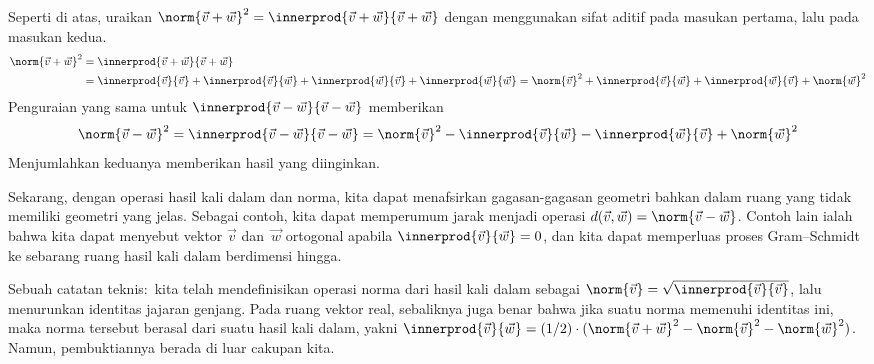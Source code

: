 Seperti di atas, uraikan
$
  \norm{\vec{v}+\vec{w}}^2=\innerprod{\vec{v}+\vec{w}}{\vec{v}+\vec{w}}
$
dengan menggunakan sifat aditif pada masukan pertama, lalu pada masukan kedua.
\begin{align*}
  \norm{\vec{v}+\vec{w}}^2
  &=\innerprod{\vec{v}+\vec{w}}{\vec{v}+\vec{w}}           \\
  &=\innerprod{\vec{v}}{\vec{v}}            
   +\innerprod{\vec{v}}{\vec{w}}
   +\innerprod{\vec{w}}{\vec{v}}
   +\innerprod{\vec{w}}{\vec{w}}
  =\norm{\vec{v}}^2            
   +\innerprod{\vec{v}}{\vec{w}}
   +\innerprod{\vec{w}}{\vec{v}}
   +\norm{\vec{w}}^2
\end{align*}
Penguraian yang sama untuk $\innerprod{\vec{v}-\vec{w}}{\vec{v}-\vec{w}}$
memberikan
\begin{equation*}
  \norm{\vec{v}-\vec{w}}^2
  =\innerprod{\vec{v}-\vec{w}}{\vec{v}-\vec{w}}
  =\norm{\vec{v}}^2
   -\innerprod{\vec{v}}{\vec{w}}
   -\innerprod{\vec{w}}{\vec{v}}
   +\norm{\vec{w}}^2
\end{equation*}
Menjumlahkan keduanya memberikan hasil yang diinginkan.

Sekarang, dengan operasi hasil kali dalam dan norma, kita dapat menafsirkan
gagasan-gagasan geometri bahkan dalam ruang yang tidak memiliki geometri yang
jelas.
Sebagai contoh, kita dapat memperumum jarak menjadi operasi
$d(\vec{v},\vec{w})=\norm{\vec{v}-\vec{w}}$.
Contoh lain ialah bahwa kita dapat menyebut vektor $\vec{v}$ dan~$\vec{w}$
ortogonal apabila $\innerprod{\vec{v}}{\vec{w}}=0$, dan kita dapat memperluas
proses Gram--Schmidt ke sebarang ruang hasil kali dalam berdimensi hingga.

Sebuah catatan teknis:~kita telah mendefinisikan operasi norma dari hasil kali
dalam sebagai $\norm{\vec{v}}=\sqrt{\smashdp{\innerprod{\vec{v}}{\vec{v}}}}$,
lalu menurunkan identitas jajaran genjang.
Pada ruang vektor real, sebaliknya juga benar bahwa jika suatu norma memenuhi
identitas ini, maka norma tersebut berasal dari suatu hasil kali dalam, yakni
$\innerprod{\vec{v}}{\vec{w}}
  =(1/2)\cdot(\norm{\vec{v}+\vec{w}}^2-\norm{\vec{v}}^2-\norm{\vec{w}}^2)$.
Namun, pembuktiannya berada di luar cakupan kita.


